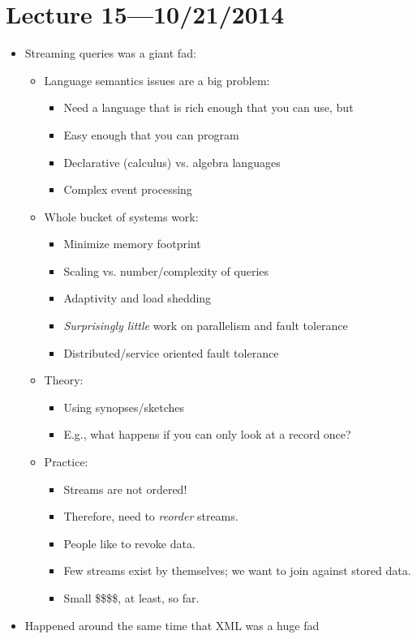 \documentclass[10pt]{article}
\begin{document}
\section{Lecture 15---10/21/2014}

\begin{itemize}
\item Streaming queries was a giant fad:
\begin{itemize}
\item Language semantics issues are a big problem:
\begin{itemize}
\item Need a language that is rich enough that you can use, but
\item Easy enough that you can program
\item Declarative (calculus) vs. algebra languages
\item Complex event processing
\end{itemize}
\item Whole bucket of systems work:
\begin{itemize}
\item Minimize memory footprint
\item Scaling vs. number/complexity of queries
\item Adaptivity and load shedding
\item \emph{Surprisingly little} work on parallelism and fault tolerance
\item Distributed/service oriented fault tolerance
\end{itemize}
\item Theory:
\begin{itemize}
\item Using synopses/sketches
\item E.g., what happens if you can only look at a record once?
\end{itemize}
\item Practice:
\begin{itemize}
\item Streams are not ordered!
\item Therefore, need to \emph{reorder} streams.
\item People like to revoke data.
\item Few streams exist by themselves; we want to join against stored data.
\item Small \$\$\$\$, at least, so far.
\end{itemize}
\end{itemize}
\item Happened around the same time that XML was a huge fad

\end{itemize}
\end{document}
